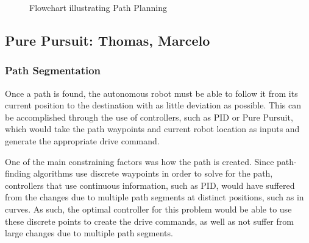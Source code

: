 \documentclass{article}
\begin{document}
\vspace{1cm}
\begin{figure}[htbp]
  \centering
  \caption{Flowchart illustrating Path Planning}
  \label{fig:scaled_flowchart_sensor_model}
\end{figure}


\subsection{Pure Pursuit: Thomas, Marcelo}

\subsubsection{Path Segmentation}
Once a path is found, the autonomous robot must be able to follow it from its current position to the destination with as little deviation as possible. This can be accomplished through the use of controllers, such as PID or Pure Pursuit, which would take the path waypoints and current robot location as inputs and generate the appropriate drive command.

One of the main constraining factors was how the path is created. Since path-finding algorithms use discrete waypoints in order to solve for the path, controllers that use continuous information, such as PID, would have suffered from the changes due to multiple path segments at distinct positions, such as in curves. As such, the optimal controller for this problem would be able to use these discrete points to create the drive commands, as well as not suffer from large changes due to multiple path segments.
\end{document}
